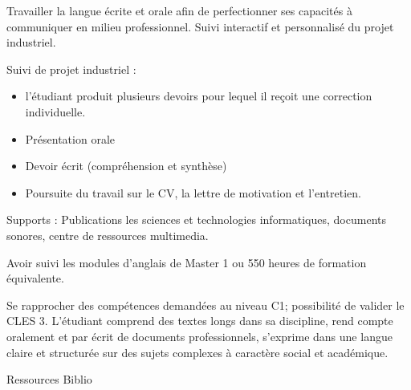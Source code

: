 \vfill

{
Travailler la langue écrite et orale afin de perfectionner ses capacités à
communiquer en milieu professionnel. Suivi interactif et personnalisé du
projet industriel.

Suivi de projet industriel :
\begin{itemize}
\item l'étudiant produit plusieurs devoirs pour lequel il reçoit une correction individuelle.
\item Présentation orale
\item Devoir écrit (compréhension et synthèse)
\item Poursuite du travail sur le CV, la lettre de motivation et l'entretien.
\end{itemize}
Supports : Publications les sciences et technologies informatiques, documents
sonores, centre de ressources multimedia.
} 
{Avoir suivi les modules d'anglais de Master 1 ou 550 heures de formation
équivalente.} 
{\begin{itemize} 
  \ObjItem Se rapprocher des compétences demandées au niveau C1; possibilité de
valider le CLES 3.
  \ObjItem L'étudiant comprend des textes longs dans sa discipline, rend compte
oralement et par écrit de documents professionnels, s'exprime dans une
langue claire et structurée sur des sujets complexes à caractère social et
académique.
\end{itemize} 
} 
{Ressources} 
{Biblio} 
 
\vfill

